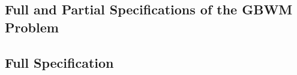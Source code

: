 \documentclass[mnsc,sglanonrev]{informs4}
\begin{document}
%
%
%
\begin{APPENDICES}

\section{Full and Partial Specifications of the GBWM Problem} \label{app:specs}

\subsection{Full Specification}


\end{APPENDICES}
\end{document}
